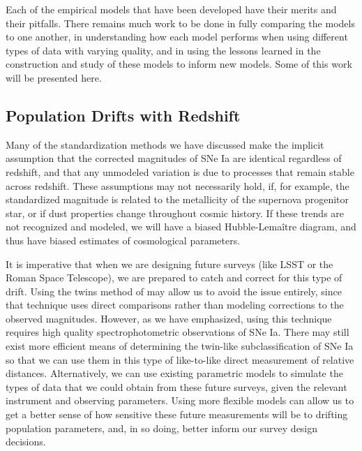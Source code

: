 Each of the empirical models that have been developed have their merits and their pitfalls. There remains much work to be done in fully comparing the models to one another, in understanding how each model performs when using different types of data with varying quality, and in using the lessons learned in the construction and study of these models to inform new models. Some of this work will be presented here.

\subsection{Population Drifts with Redshift}
Many of the standardization methods we have discussed make the implicit assumption that the corrected magnitudes of SNe Ia are identical regardless of redshift, and that any unmodeled variation is due to processes that remain stable across redshift. These assumptions may not necessarily hold, if, for example, the standardized magnitude is related to the metallicity of the supernova progenitor star, or if dust properties change throughout cosmic history. If these trends are not recognized and modeled, we will have a biased Hubble-Lema\^{i}tre diagram, and thus have biased estimates of cosmological parameters.

It is imperative that when we are designing future surveys (like LSST or the Roman Space Telescope), we are prepared to catch and correct for this type of drift. Using the twins method of \citet{fakhouri_improving_2015} may allow us to avoid the issue entirely, since that technique uses direct comparisons rather than modeling corrections to the observed magnitudes. However, as we have emphasized, using this technique requires high quality spectrophotometric observations of SNe Ia. There may still exist more efficient means of determining the twin-like subclassification of SNe Ia so that we can use them in this type of like-to-like direct measurement of relative distances. Alternatively, we can use existing parametric models to simulate the types of data that we could obtain from these future surveys, given the relevant instrument and observing parameters. Using more flexible models can allow us to get a better sense of how sensitive these future measurements will be to drifting population parameters, and, in so doing, better inform our survey design decisions.

